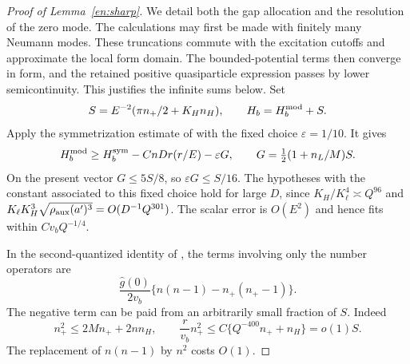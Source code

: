 \begin{proof}[Proof of Lemma~\ref{en:sharp}]
We detail both the gap allocation and the resolution of the zero mode.
The calculations may first be made with finitely many Neumann modes.
These truncations commute with the excitation cutoffs and approximate
the local form domain.  The bounded-potential terms then converge in
form, and the retained positive quasiparticle expression passes by lower
semicontinuity.  This justifies the infinite sums below.
Set
\[
 S=E^{-2}(\pi n_+/2+K_Hn_H),\qquad H_b=H_b^{\rm mod}+S.
\]
Apply the symmetrization estimate of \cite[Theorem~2.6]{FJGMOT}
with the fixed choice $\varepsilon=1/10$.  It gives
\begin{equation}\label{en:symmetrization}
 H_b^{\rm mod}\ge H_b^{\rm sym}-CnDr(r/E)-\varepsilon G,
 \qquad
 G=\tfrac12(1+n_L/M)S.
\end{equation}
On the present vector $G\le5S/8$, so $\varepsilon G\le S/16$.
The hypotheses with the constant associated to this fixed choice hold
for large $D$, since $K_H/K_\ell^4\asymp Q^{96}$ and
$K_\ell K_H^3\sqrt{\rho_{\rm aux}(a')^3}=O(D^{-1}Q^{301})$.
The scalar error is $O(E^2)$ and hence fits within $Cv_bQ^{-1/4}$.

In the second-quantized identity of \cite[Lemma~2.8]{FJGMOT}, the terms
involving only the number operators are
\[
 \frac{\widehat g(0)}{2v_b}
       \{n(n-1)-n_+(n_+-1)\}.
\]
The negative term can be paid from an arbitrarily small fraction of $S$.
Indeed
\begin{equation}\label{en:self-interaction}
 n_+^2\le2Mn_++2nn_H,
 \qquad
 \frac r{v_b}n_+^2
   \le C\{Q^{-400}n_++n_H\}=o(1)S.
\end{equation}
The replacement of $n(n-1)$ by $n^2$ costs $O(1)$.


\end{proof}
